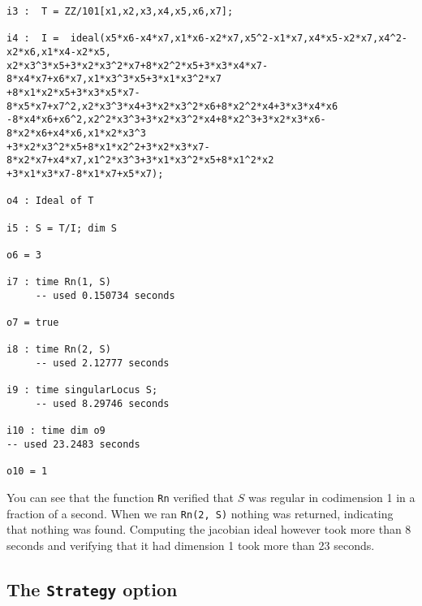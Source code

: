 \documentclass[11pt]{amsart}
\begin{document}
{\small\color{blue}
\begin{verbatim}
i3 :  T = ZZ/101[x1,x2,x3,x4,x5,x6,x7];

i4 :  I =  ideal(x5*x6-x4*x7,x1*x6-x2*x7,x5^2-x1*x7,x4*x5-x2*x7,x4^2-x2*x6,x1*x4-x2*x5,
x2*x3^3*x5+3*x2*x3^2*x7+8*x2^2*x5+3*x3*x4*x7-8*x4*x7+x6*x7,x1*x3^3*x5+3*x1*x3^2*x7
+8*x1*x2*x5+3*x3*x5*x7-8*x5*x7+x7^2,x2*x3^3*x4+3*x2*x3^2*x6+8*x2^2*x4+3*x3*x4*x6
-8*x4*x6+x6^2,x2^2*x3^3+3*x2*x3^2*x4+8*x2^3+3*x2*x3*x6-8*x2*x6+x4*x6,x1*x2*x3^3
+3*x2*x3^2*x5+8*x1*x2^2+3*x2*x3*x7-8*x2*x7+x4*x7,x1^2*x3^3+3*x1*x3^2*x5+8*x1^2*x2
+3*x1*x3*x7-8*x1*x7+x5*x7);

o4 : Ideal of T

i5 : S = T/I; dim S

o6 = 3

i7 : time Rn(1, S)
     -- used 0.150734 seconds

o7 = true

i8 : time Rn(2, S)
     -- used 2.12777 seconds

i9 : time singularLocus S;
     -- used 8.29746 seconds

i10 : time dim o9
-- used 23.2483 seconds

o10 = 1
\end{verbatim}
}
You can see that the function {\tt Rn} verified that $S$ was regular in codimension 1 in a fraction of a second.  When we ran {\tt Rn(2, S)} nothing was returned, indicating that nothing was found.  Computing the jacobian ideal however took more than 8 seconds and verifying that it had dimension 1 took more than 23 seconds.  

\subsection{The {\tt Strategy} option}
\end{document}
